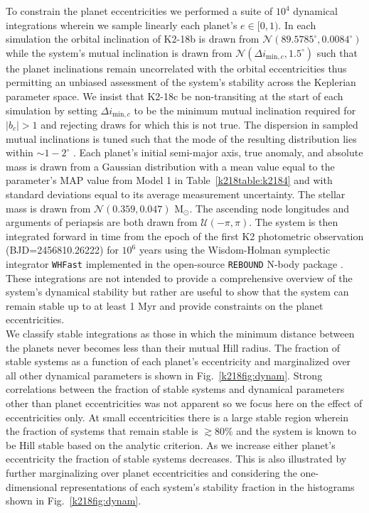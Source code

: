 To constrain the planet eccentricities
we performed a suite of $10^4$ dynamical integrations wherein we sample linearly
each planet's $e \in [0,1)$.
In each simulation the orbital inclination of K2-18b is drawn from
$\mathcal{N}(89.5785^{\circ},0.0084^{\circ})$ while the
system's mutual inclination is drawn from $\mathcal{N}(\Delta i_{\text{min},c},1.5^{\circ})$ 
such that the planet inclinations remain uncorrelated with the orbital eccentricities thus permitting
an unbiased assessment of the system's stability across the Keplerian parameter space. 
We insist that K2-18c be non-transiting at the start of each simulation by setting
$\Delta i_{\text{min},c}$ to be the minimum mutual inclination required for $|b_c|>1$
and rejecting draws for which this is not true. 
The dispersion in sampled mutual inclinations is tuned such that the mode of the resulting distribution
lies within $\sim 1-2^{\circ}$ \citep{fabrycky14}.
Each planet's initial semi-major axis, true anomaly, and absolute mass is drawn from a Gaussian
distribution with a mean value equal to the parameter's MAP value from Model 1 in
Table~\ref{k218table:k2184} and with standard deviations equal to its average measurement uncertainty.
The stellar mass is drawn from $\mathcal{N}(0.359,0.047)$ M$_{\odot}$.
The ascending node longitudes and arguments of
periapsis are both drawn from $\mathcal{U}(-\pi,\pi)$. The system is then integrated forward in time
from the epoch of the first K2 photometric observation (BJD=2456810.26222) for $10^6$ years using 
the Wisdom-Holman symplectic integrator \texttt{WHFast} \citep{rein15} implemented in the
open-source \texttt{REBOUND} N-body package \citep{rein12}. These integrations are not intended to
provide a comprehensive overview of the system's dynamical stability but rather are 
useful to show that the 
system can remain stable up to at least 1 Myr and provide constraints on the planet
eccentricities. \\

We classify stable integrations as those in which the minimum distance between the planets never
becomes less than their mutual Hill radius. The fraction of stable systems as a function of each
planet's eccentricity and marginalized over all other dynamical parameters 
is shown in Fig.~\ref{k218fig:dynam}. Strong correlations between the fraction of stable systems and
dynamical parameters other than planet eccentricities was not apparent so we focus here on the
effect of eccentricities only. At small eccentricities there is a 
large stable region wherein the fraction of systems that remain stable is $\gtrsim 80$\%
and the system is known to be Hill stable based on the analytic criterion.
As we increase either planet's eccentricity the fraction of stable systems decreases.
This is also illustrated by further marginalizing over planet eccentricities and considering the 
one-dimensional representations of each system's stability fraction in the histograms shown in 
Fig.~\ref{k218fig:dynam}. \\

